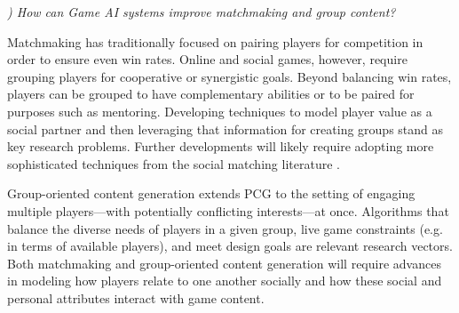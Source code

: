 \documentclass[conference]{IEEEtran}
\newcounter{questionno}
\newcommand{\subsubsectionx}[1]{{\em {\arabic{questionno}) #1}}
	\addtocounter{questionno}{1}
	}
\begin{document}
\subsubsectionx{How can Game AI systems improve matchmaking and group content?}
%
Matchmaking has traditionally focused on pairing players for competition in order to ensure even win rates.
Online and social games, however, require grouping players for cooperative or synergistic goals. Beyond balancing win rates, players can be grouped to have complementary abilities or to be paired for purposes such as mentoring. 
Developing techniques to model player value as a social partner and then leveraging that information for creating groups stand as key research problems. Further developments will likely require adopting more sophisticated techniques from the social matching literature \cite{terveen2005:social-matching}. 

Group-oriented content generation extends PCG to the setting of engaging multiple players---with potentially conflicting interests---at once.
Algorithms that balance the diverse needs of players in a given group, live game constraints (e.g. in terms of available players), and meet design goals are relevant research vectors.
Both matchmaking and group-oriented content generation will require advances in modeling how players relate to one another socially and how these social and personal attributes interact with game content. 
\end{document}
